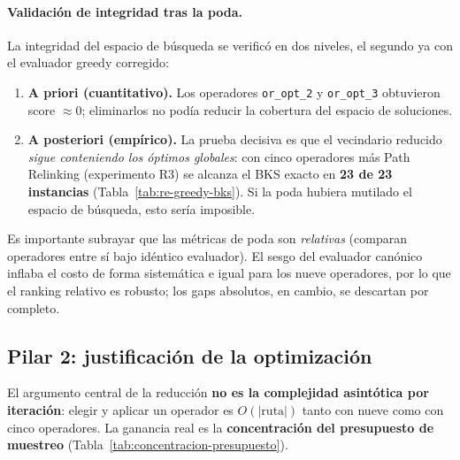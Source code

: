 \paragraph{Validación de integridad tras la poda.}
La integridad del espacio de búsqueda se verificó en dos niveles, el
segundo ya con el evaluador greedy corregido:

\begin{enumerate}
\item \textbf{A priori (cuantitativo).} Los operadores \texttt{or\_opt\_2}
  y \texttt{or\_opt\_3} obtuvieron score $\approx 0$; eliminarlos no podía
  reducir la cobertura del espacio de soluciones.
\item \textbf{A posteriori (empírico).} La prueba decisiva es que el
  vecindario reducido \emph{sigue conteniendo los óptimos globales}: con
  cinco operadores más Path Relinking (experimento R3) se alcanza el BKS
  exacto en \textbf{23 de 23 instancias} (Tabla~\ref{tab:re-greedy-bks}).
  Si la poda hubiera mutilado el espacio de búsqueda, esto sería imposible.
\end{enumerate}

\noindent Es importante subrayar que las métricas de poda son
\emph{relativas} (comparan operadores entre sí bajo idéntico evaluador). El
sesgo del evaluador canónico inflaba el costo de forma sistemática e igual
para los nueve operadores, por lo que el ranking relativo es robusto; los
gaps absolutos, en cambio, se descartan por completo.

\subsection{Pilar 2: justificación de la optimización}
\label{subsec:pilar-justificacion}

El argumento central de la reducción \textbf{no es la complejidad
asintótica por iteración}: elegir y aplicar un operador es
$O(|\text{ruta}|)$ tanto con nueve como con cinco operadores. La ganancia
real es la \textbf{concentración del presupuesto de muestreo}
(Tabla~\ref{tab:concentracion-presupuesto}).

